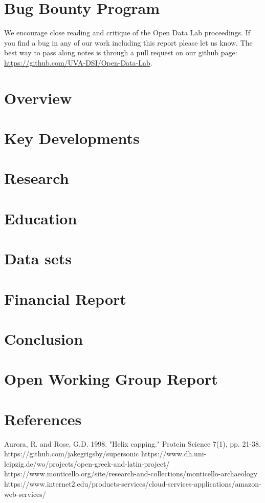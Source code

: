 \documentclass[12pt,letterpaper]{book} %
\begin{document}
\chapter*{Bug Bounty Program}
We encourage close reading and critique of the Open Data Lab proceedings. If you find a bug in any of our work including this report please let us know. The best way to pass along notes is through a pull request on our github page: \url{https://github.com/UVA-DSI/Open-Data-Lab}.

\tableofcontents
\listoffigures
\listoftables

\mainmatter
\chapter{Overview} 
\chapter{Key Developments} 
\chapter{Research} 
\chapter{Education} 
\chapter{Data sets} 	
\chapter{Financial Report} 
\chapter{Conclusion}

\appendix
\chapter{Open Working Group Report}\label{chap:owg}
 

\chapter{References}
\begin{thebibliography}{99}
 Aurora, R. and Rose, G.D. 1998. "Helix capping." Protein Science 7(1), pp. 21-38.
 https://github.com/jakegrigsby/supersonic
 https://www.dh.uni-leipzig.de/wo/projects/open-greek-and-latin-project/
 https://www.monticello.org/site/research-and-collections/monticello-archaeology
 https://www.internet2.edu/products-services/cloud-services-applications/amazon-web-services/
\end{thebibliography}
\end{document}
